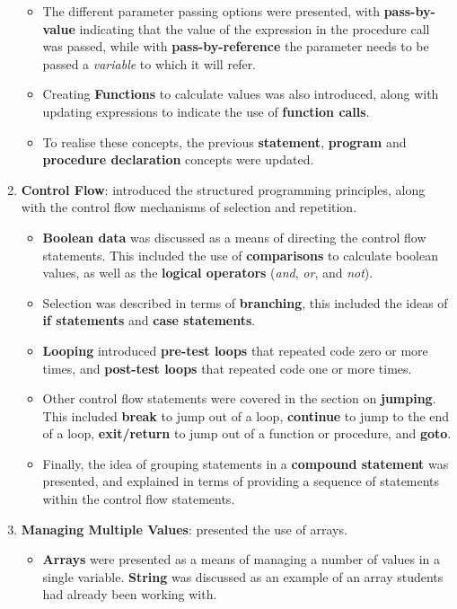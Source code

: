 \begin{enumerate}
\begin{itemize}[noitemsep,nolistsep]
    \item The different parameter passing options were presented, with \textbf{pass-by-value} indicating that the value of the expression in the procedure call was passed, while with \textbf{pass-by-reference} the parameter needs to be passed a \emph{variable} to which it will refer.
    \item Creating \textbf{Functions} to calculate values was also introduced, along with updating expressions to indicate the use of \textbf{function calls}.
    \item To realise these concepts, the previous \textbf{statement}, \textbf{program} and \textbf{procedure declaration} concepts were updated.
  \end{itemize}
  \item \textbf{Control Flow}: introduced the structured programming principles, along with the control flow mechanisms of selection and repetition.
  \begin{itemize}[noitemsep,nolistsep]
    \item \textbf{Boolean data} was discussed as a means of directing the control flow statements. This included the use of \textbf{comparisons} to calculate boolean values, as well as the \textbf{logical operators} (\emph{and}, \emph{or}, and \emph{not}).
    \item Selection was described in terms of \textbf{branching}, this included the ideas of \textbf{if statements} and \textbf{case statements}.
    \item \textbf{Looping} introduced \textbf{pre-test loops} that repeated code zero or more times, and \textbf{post-test loops} that repeated code one or more times. 
    \item Other control flow statements were covered in the section on \textbf{jumping}. This included \textbf{break} to jump out of a loop, \textbf{continue} to jump to the end of a loop, \textbf{exit/return} to jump out of a function or procedure, and \textbf{goto}.
    \item Finally, the idea of grouping statements in a \textbf{compound statement} was presented, and explained in terms of providing a sequence of statements within the control flow statements.
  \end{itemize}
  \item \textbf{Managing Multiple Values}: presented the use of arrays.
  \begin{itemize}[noitemsep,nolistsep]
    \item \textbf{Arrays} were presented as a means of managing a number of values in a single variable. \textbf{String} was discussed as an example of an array students had already been working with.

\end{itemize}
\end{enumerate}
